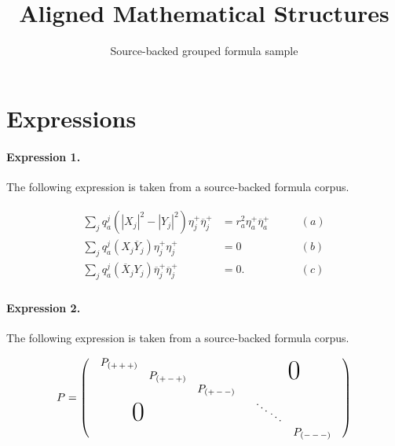 \documentclass[11pt]{article}
\title{Aligned Mathematical Structures}
\author{Source-backed grouped formula sample}
\date{}
\begin{document}
\maketitle
\section{Expressions}
\paragraph{Expression 1.} The following expression is taken from a source-backed formula corpus.

\begin{align*}\begin{array}{lcr}\sum\limits_{j}q^j_a(|X_j|^2-|Y_j|^2)\eta_j^+\overline{\eta}_j^+&=r^2_a\eta_a^+\overline{\eta}_a^+ \qquad &(a)\\\sum\limits_{j}q^j_a(X_j\overline{Y}_j)\eta_j^+{\eta}_j^+&=0 \qquad &(b)\\\sum\limits_{j}q^j_a(\overline {X}_j{Y_j})\overline{\eta}_j^+\overline{\eta}_j^+&=0. \qquad &(c)\end{array}\end{align*}

\paragraph{Expression 2.} The following expression is taken from a source-backed formula corpus.

\begin{align*}P = \left( \begin{array}{cc}\begin{array}{ccc}P_{(+\,+\,+)} & & \\ &P_{(+\,-\,+)} & \\ & &P_{(+\,-\,-)}\end{array} & \text{\Huge 0} \\\hspace*{-19mm} \text{\Huge 0} &\begin{array}{ccc}\vspace*{-3.5mm}\hspace*{-0.5mm}\ddots & & \\ &\hspace*{-3.1mm} \ddots & \\ & &P_{(-\,-\,-)}\end{array}\end{array} \right)\end{align*}
\end{document}

